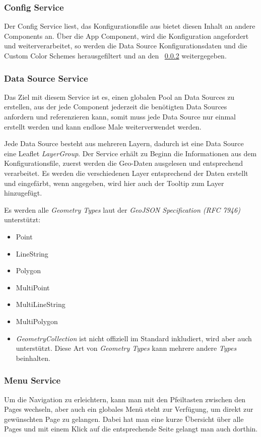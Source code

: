 \subsubsection{Config Service}
Der Config Service liest, das Konfigurationsfile aus bietet diesen Inhalt an andere Components an.
Über die App Component, wird die Konfiguration angefordert und weiterverarbeitet, so werden die Data Source Konfigurationsdaten
und die Custom Color Schemes herausgefiltert und an den ~\ref{subsubsec:data-source-service} weitergegeben.

\subsubsection{Data Source Service}
\label{subsubsec:data-source-service}
Das Ziel mit diesem Service ist es, einen globalen Pool an Data Sources zu erstellen, aus der jede Component jederzeit die
benötigten Data Sources anfordern und referenzieren kann, somit muss jede Data Source nur einmal erstellt werden und kann endlose Male weiterverwendet werden.

Jede Data Source besteht aus mehreren Layern, dadurch ist eine Data Source eine Leaflet \emph{LayerGroup}.
Der Service erhält zu Beginn die Informationen aus dem Konfigurationsfile, zuerst werden die Geo-Daten ausgelesen und entsprechend verarbeitet.
Es werden die verschiedenen Layer entsprechend der Daten erstellt und eingefärbt, wenn angegeben, wird hier auch der Tooltip zum Layer hinzugefügt.

Es werden alle \emph{Geometry Types} laut der \emph{GeoJSON Specification (RFC 7946)}~\cite{rfc7946} unterstützt:

\begin{itemize}
    \item Point
    \item LineString
    \item Polygon
    \item MultiPoint
    \item MultiLineString
    \item MultiPolygon
    \item \emph{GeometryCollection} ist nicht offiziell im Standard inkludiert, wird aber auch unterstützt.
    Diese Art von \emph{Geometry Types} kann mehrere andere \emph{Types} beinhalten.
\end{itemize}

\subsubsection{Menu Service}
Um die Navigation zu erleichtern, kann man mit den Pfeiltasten zwischen den Pages wechseln, aber auch ein globales Menü
steht zur Verfügung, um direkt zur gewünschten Page zu gelangen.
Dabei hat man eine kurze Übersicht über alle Pages und mit einem Klick auf die entsprechende Seite gelangt man auch dorthin.


